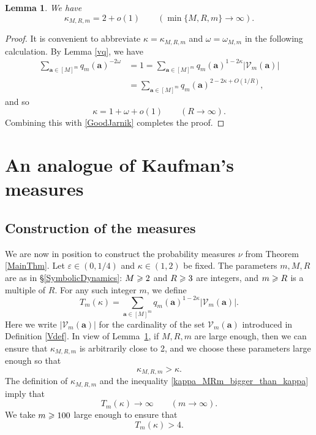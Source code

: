 \documentclass[12pt, reqno]{amsart}
\newtheorem{lemma}[thm]{Lemma}
\theoremstyle{definition}
\theoremstyle{remark}
\numberwithin{equation}{section}
\def\kap{{\kappa}}
\def\ome{{\omega}} \def\Ome{{\Omega}} \def\bfome{{\boldsymbol \ome}}
\def\eps{\varepsilon}
\def \ba {\mathbf a}
\def \cV {\mathcal V}
\begin{document}
\begin{lemma} \label{lem_kappa_tends_to_two} We have
\[
\kap_{M,R,m} = 2 + o(1) \qquad
(\min\{M, R, m\} \to \infty).
\]
\end{lemma}

\begin{proof}
It is convenient to abbreviate 
$\kap = \kap_{M,R,m}$ and 
$\ome = \ome_{M,m}$ in the following calculation.
By Lemma \ref{vq}, we have
\begin{align*}
\sum_{\ba \in [M]^m} 
q_m(\ba)^{-2\ome}
&= 1
= \sum_{\ba \in [M]^m} 
q_m(\ba)^{1-2\kap} |\cV_m(\ba)|
\\&= \sum_{\ba \in [M]^m} q_m(\ba)^{2-2\kap+O(1/R)},
\end{align*}
and so
\[
\kap = 1 + \ome + o(1) \qquad (R \to \infty).
\]
Combining this with \eqref{GoodJarnik} completes the proof.
\end{proof}

\section{An analogue of Kaufman's measures}
\label{MeasureConstruction}

\subsection{Construction of the measures} \label{subsection_ConstructionOfMeasures}

We are now in position to construct the probability measures $\nu$ from Theorem \ref{MainThm}. Let 
$\eps \in (0,1/4)$ and 
$\kap \in (1,2)$ be fixed. The parameters $m,M, R$ are as in \S \ref{SymbolicDynamics}: $M\geqslant 2$ and $R\geqslant 3$ are integers, and $m\geqslant R$ is a multiple of $R.$ 
For any such integer $m$, we define 
\[
T_m(\kap) = \sum_{\ba \in [M]^m} q_m(\ba)^{1-2\kap}|\cV_m(\ba)|.
\]
Here we write $|\cV_m(\ba)|$ for the cardinality of the set $\cV_m(\ba)$ introduced in Definition \ref{Vdef}.  
In view of Lemma~\ref{lem_kappa_tends_to_two}, if $M,R,m$ are large enough, then we can ensure that $\kappa_{M,R,m}$ is arbitrarily close to 2, and we choose these parameters large enough so that
\begin{equation} \label{kappa_MRm_bigger_than_kappa}
\kappa_{M,R,m}>\kappa.
\end{equation}
The definition of $\kappa_{M,R,m}$ and the inequality
\eqref{kappa_MRm_bigger_than_kappa} 
imply that
\[
T_m(\kap) \to \infty \qquad (m \to \infty).
\]
We take $m \geqslant 100$ large enough to ensure that
\begin{equation} \label{T_m_is_large}
T_m(\kap) > 4.
\end{equation}
\end{document}

